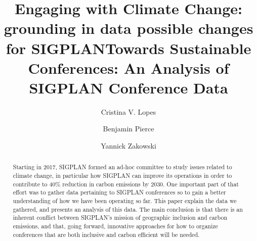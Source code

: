 \documentclass[manuscript, review, screen]{acmart}
\title{Engaging with Climate Change: grounding in data possible changes for SIGPLAN}
\begin{document}
\title{Towards Sustainable Conferences: An Analysis of SIGPLAN Conference Data}

\author{Cristina V. Lopes}

\author{Benjamin Pierce}

\author{Yannick Zakowski}

\begin{abstract}

Starting in 2017, SIGPLAN formed an ad-hoc committee to study issues related to
climate change, in particular how SIGPLAN can improve its operations in order to
contribute to 40\% reduction in carbon emissions by 2030. One important part of
that effort was to gather data pertaining to SIGPLAN conferences so to gain a
better understanding of how we have been operating so far. This paper explain
the data we gathered, and presents an analysis of this data. The main conclusion
is that there is an inherent conflict between SIGPLAN's mission of geographic
inclusion and carbon emissions, and that, going forward, innovative approaches
for how to organize conferences that are both inclusive and carbon efficient
will be needed.

\end{abstract}


\maketitle







\end{document}
